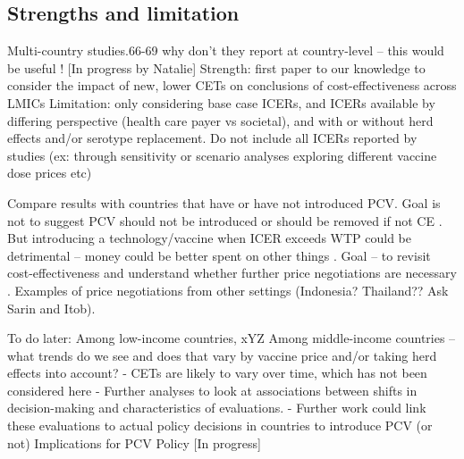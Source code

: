 \documentclass[12pt]{article}
\begin{document}
\subsection{Strengths and limitation}
Multi-country studies.66-69 why don't they report at country-level – this would be useful !
[In progress by Natalie]
Strength: first paper to our knowledge to consider the impact of new, lower CETs on conclusions of cost-effectiveness across LMICs
Limitation: only considering base case ICERs, and ICERs available by differing perspective (health care payer vs societal), and with or without herd effects and/or serotype replacement.
Do not include all ICERs reported by studies (ex: through sensitivity or scenario analyses exploring different vaccine dose prices etc)

Compare results with countries that have or have not introduced PCV. Goal is not to suggest PCV should not be introduced or should be removed if not CE . But introducing a technology/vaccine when ICER exceeds WTP could be detrimental – money could be better spent on other things .
Goal – to revisit cost-effectiveness and understand whether further price negotiations are necessary . Examples of price negotiations from other settings (Indonesia? Thailand?? Ask Sarin and Itob). 

To do later:
Among low-income countries, xYZ 
Among middle-income countries – what trends do we see and does that vary by vaccine price and/or taking herd effects into account?
-	CETs are likely to vary over time, which has not been considered here
-	Further analyses to look at associations between shifts in decision-making and characteristics of evaluations.
-	Further work could link these evaluations to actual policy decisions in countries to introduce PCV (or not)
Implications for PCV Policy
[In progress]



\clearpage
\printbibliography
\end{document}
